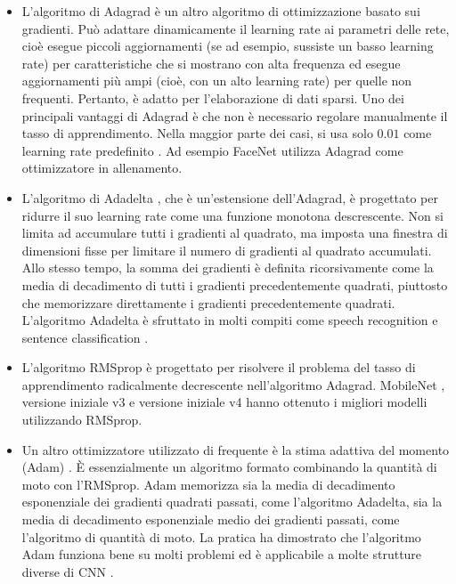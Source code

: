 \begin{itemize}
    \item  L'algoritmo di Adagrad \cite{duchi2011adaptive} è un altro algoritmo di ottimizzazione basato sui gradienti.
           Può adattare dinamicamente il learning rate ai parametri delle rete, cioè esegue piccoli aggiornamenti 
           (se ad esempio, sussiste un basso learning rate) per caratteristiche che si mostrano con alta frequenza 
           ed esegue aggiornamenti più ampi (cioè, con un alto learning rate) per quelle non frequenti. 
           Pertanto, è adatto per l'elaborazione di dati sparsi. Uno dei principali vantaggi di Adagrad è che non è 
           necessario regolare manualmente il tasso di apprendimento. 
           Nella maggior parte dei casi, si usa solo $0.01$ come learning rate predefinito \cite{ma2018shufflenet}. 
           Ad esempio FaceNet \cite{schroff2015facenet} utilizza Adagrad come ottimizzatore in allenamento.

    \item L'algoritmo di Adadelta \cite{zeiler2012adadelta}, che è un'estensione dell'Adagrad, è progettato per 
          ridurre il suo learning rate come una funzione monotona descrescente.
          Non si limita ad accumulare tutti i gradienti al quadrato, ma imposta una finestra di dimensioni fisse 
          per limitare il numero di gradienti al quadrato accumulati. Allo stesso tempo, la somma dei gradienti 
          è definita ricorsivamente come la media di decadimento di tutti i gradienti precedentemente quadrati,
          piuttosto che memorizzare direttamente i gradienti precedentemente quadrati. L'algoritmo Adadelta è 
          sfruttato in molti compiti come speech recognition e sentence classification \cite{chorowski2015attention,
          kim-2014-convolutional}.

    \item L'algoritmo RMSprop \cite{hinton2012neural} è progettato per risolvere il problema del tasso di 
          apprendimento radicalmente decrescente nell'algoritmo Adagrad. MobileNet \cite{howard2017mobilenets}, 
          versione iniziale v3 \cite{szegedy2016rethinking} e versione iniziale v4 \cite{szegedy2017inception} 
          hanno ottenuto i migliori modelli utilizzando RMSprop.

    \item Un altro ottimizzatore utilizzato di frequente è la stima adattiva del momento (Adam) \cite{kingma2014adam}. 
          È essenzialmente un algoritmo formato combinando la quantità di moto con l'RMSprop. Adam memorizza 
          sia la media di decadimento esponenziale dei gradienti quadrati passati, come l'algoritmo Adadelta, 
          sia la media di decadimento esponenziale medio dei gradienti passati, come l'algoritmo di quantità di moto. 
          La pratica ha dimostrato che l'algoritmo Adam funziona bene su molti problemi ed è applicabile a molte 
          strutture diverse di CNN \cite{sharma2015action,van2018predicting}.


\end{itemize}
